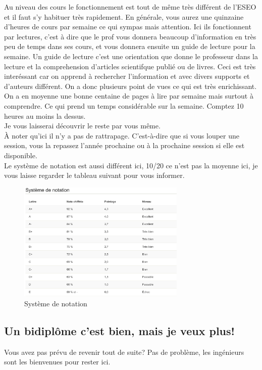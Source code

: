 Au niveau des cours le fonctionnement est tout de même très différent de l'ESEO et il faut s'y habituer très rapidement. En générale, vous aurez une quinzaine d'heures de cours par semaine ce qui sympas mais attention. Ici ils fonctionnent par lectures, c'est à dire que le prof vous donnera beaucoup d'information en très peu de temps dans ses cours, et vous donnera ensuite un guide de lecture pour la semaine. Un guide de lecture c'est une orientation que donne le professeur dans la lecture et la comprehension d'articles scientifque publié ou de livres. Ceci est très interéssant car on apprend à rechercher l'information et avec divers supports et d'auteurs différent. On a donc plusieurs point de vues ce qui est très enrichissant. On a en moyenne une bonne centaine de pages à lire par semaine mais surtout à comprendre. Ce qui prend un temps considérable sur la semaine. Comptez 10 heures au moins la dessus. \\
Je vous laisserai découvrir le reste par vous même.\\
À noter qu'ici il n'y a pas de rattrapage. C'est-à-dire que si vous louper une session, vous la repassez l'année prochaine ou à la prochaine session si elle est disponible. \\
Le système de notation est aussi différent ici, 10/20 ce n'est pas la moyenne ici, je vous laisse regarder le tableau suivant pour vous informer.


\begin{figure}[h!]
\centering
\includegraphics[width = 80mm]{figures/Sys_Notation}
\caption{Système de notation}
\end{figure}


\subsection{Un bidiplôme c’est bien, mais je veux plus!}\label{sec:sec4.7.2}

Vous avez pas prévu de revenir tout de suite? Pas de problème, les ingénieurs sont les bienvenues pour rester ici.

